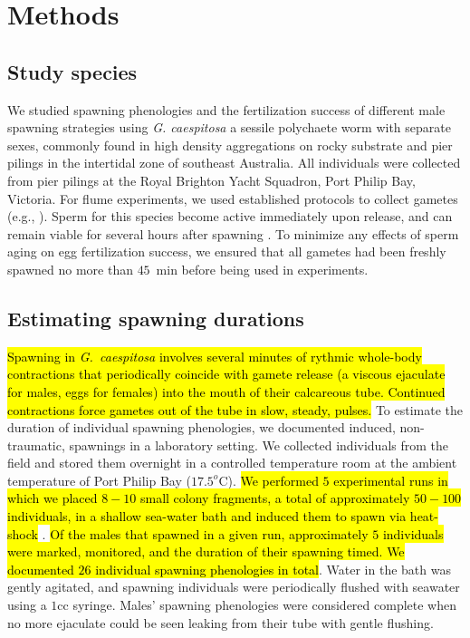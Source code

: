 \documentclass{article}
\begin{document}
\section{Methods} 
	\label{sec:methods}

	\subsection*{Study species}
	We studied spawning phenologies and the fertilization success of different male spawning strategies using \textit{G. caespitosa} a sessile polychaete worm with separate sexes, commonly found in high density aggregations on rocky substrate and pier pilings in the intertidal zone of southeast Australia. All individuals were collected from pier pilings at the Royal Brighton Yacht Squadron, Port Philip Bay, Victoria. For flume experiments, we used established protocols to collect gametes (e.g., \citealt{MarshallEvans2005a, MarshallEvans2005b}). Sperm for this species become active immediately upon release, and can remain viable for several hours after spawning \citep{Kupriyanova2013}. To minimize any effects of sperm aging on egg fertilization success, we ensured that all gametes had been freshly spawned no more than $45$~min before being used in experiments.

	\subsection*{Estimating spawning durations}
	\hl{Spawning in \textit{G.~caespitosa} involves several minutes of rythmic whole-body contractions that periodically coincide with gamete release (a viscous ejaculate for males, eggs for females) into the mouth of their calcareous tube. Continued contractions force gametes out of the tube in slow, steady, pulses.} To estimate the duration of individual spawning phenologies, we documented induced, non-traumatic, spawnings in a laboratory setting. We collected individuals from the field and stored them overnight in a controlled temperature room at the ambient temperature of Port Philip Bay ($17.5^o$C). \hl{We performed $5$ experimental runs in which we placed $8-10$ small colony fragments, a total of approximately $50-100$ individuals, in a shallow sea-water bath and induced them to spawn via heat-shock} \citep{Strathmann1987}. \hl{Of the males that spawned in a given run, approximately $5$ individuals were marked, monitored, and the duration of their spawning timed. We documented $26$ individual spawning phenologies in total}. Water in the bath was gently agitated, and spawning individuals were periodically flushed with seawater using a $1$cc syringe. Males' spawning phenologies were considered complete when no more ejaculate could be seen leaking from their tube with gentle flushing. 
\end{document}
